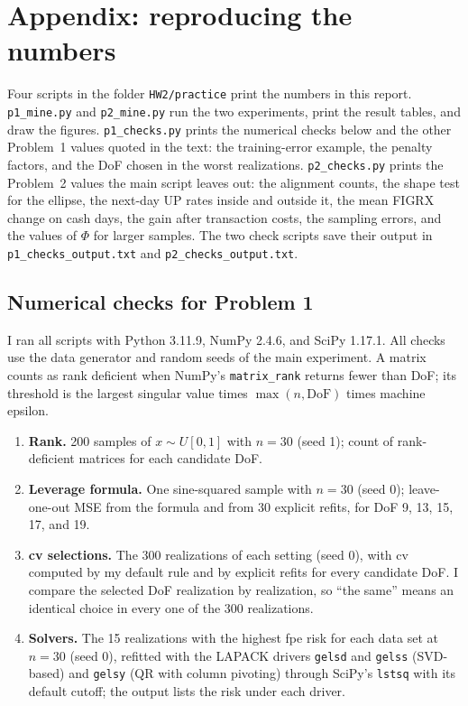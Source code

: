 
\section*{Appendix: reproducing the numbers}
Four scripts in the folder \texttt{HW2/practice} print the numbers in this report. \texttt{p1\_mine.py} and
\texttt{p2\_mine.py} run the two experiments, print the result tables, and draw the figures. \texttt{p1\_checks.py}
prints the numerical checks below and the other Problem~1 values quoted in the text: the training-error example, the
penalty factors, and the DoF chosen in the worst realizations. \texttt{p2\_checks.py} prints the Problem~2 values the
main script leaves out: the alignment counts, the shape test for the ellipse, the next-day UP rates inside and
outside it, the mean FIGRX change on cash days, the gain after transaction costs, the sampling errors, and the
values of $\Phi$ for larger samples. The two check scripts save their output in \texttt{p1\_checks\_output.txt} and
\texttt{p2\_checks\_output.txt}.

\subsection*{Numerical checks for Problem 1}
I ran all scripts with Python 3.11.9, NumPy 2.4.6, and SciPy 1.17.1. All checks use the data generator and random seeds of the main experiment. A matrix counts as rank
deficient when NumPy's \texttt{matrix\_rank} returns fewer than DoF; its threshold is the largest singular value
times $\max(n, \text{DoF})$ times machine epsilon.
\begin{enumerate}
  \item \textbf{Rank.} 200 samples of $x \sim U[0,1]$ with $n = 30$ (seed 1); count of rank-deficient matrices for each
        candidate DoF.
  \item \textbf{Leverage formula.} One sine-squared sample with $n = 30$ (seed 0); leave-one-out MSE from the formula
        and from 30 explicit refits, for DoF 9, 13, 15, 17, and 19.
  \item \textbf{cv selections.} The 300 realizations of each setting (seed 0), with cv computed by my default rule and by
        explicit refits for every candidate DoF. I compare the selected DoF realization by realization, so ``the same''
        means an identical choice in every one of the 300 realizations.
  \item \textbf{Solvers.} The 15 realizations with the highest fpe risk for each data set at $n = 30$ (seed 0), refitted
        with the LAPACK drivers \texttt{gelsd} and \texttt{gelss} (SVD-based) and \texttt{gelsy} (QR with column
        pivoting) through SciPy's \texttt{lstsq} with its default cutoff; the output lists the risk under each driver.
\end{enumerate}
